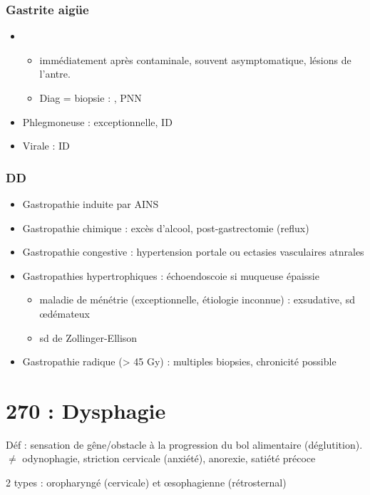 \documentclass[11pt]{article}
\begin{document}
\subsubsection{Gastrite aigüe}
\label{sec:org4332836}
\begin{itemize}
\item {}
\begin{itemize}
\item immédiatement après contaminale, souvent asymptomatique, lésions de l'antre.
\item Diag = biopsie : , PNN
\end{itemize}
\item Phlegmoneuse : exceptionnelle, ID
\item Virale : ID
\end{itemize}


\subsubsection{DD}
\label{sec:orga1b4f0f}
\begin{itemize}
\item Gastropathie induite par AINS
\item Gastropathie chimique : excès d'alcool, post-gastrectomie (reflux)
\item Gastropathie congestive : hypertension portale ou ectasies vasculaires
atnrales
\item Gastropathies hypertrophiques : échoendoscoie si muqueuse épaissie
\begin{itemize}
\item maladie de ménétrie (exceptionnelle, étiologie inconnue) : exsudative, sd
\oe{}démateux
\item sd de Zollinger-Ellison
\end{itemize}
\item Gastropathie radique (> 45 Gy) : multiples biopsies, chronicité possible
\end{itemize}

\section{270 : Dysphagie}
\label{sec:org719aea7}
Déf : sensation de gêne/obstacle à la progression du bol alimentaire
(déglutition). \(\ne\) odynophagie, striction cervicale (anxiété), anorexie, satiété
précoce

2 types : oropharyngé (cervicale) et \oe{}sophagienne (rétrosternal)
\end{document}
